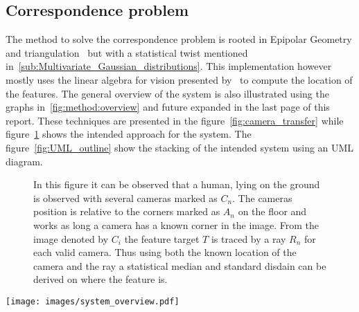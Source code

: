\subsection{Correspondence problem}
The method to solve the correspondence problem is rooted in  Epipolar Geometry and triangulation~\cite{siciliano2010robotics} but with a statistical twist mentioned in~\ref{sub:Multivariate_Gaussian_distributions}.
This implementation however mostly uses the linear algebra for vision presented by~\cite{corke2017robotics} to compute the location of the features.
The general overview of the system is also illustrated using the graphs in~\ref{fig:method:overview} and future expanded in the last page of this report.
These techniques are presented in the figure~\ref{fig:camera_transfer} while figure~\ref{fig:3Dhuman} shows the intended approach for the system.
The figure~\ref{fig:UML_outline} show the stacking of the intended system using an UML diagram.
\def\svgwidth{\columnwidth}
\begin{figure}[ht]
    \centering
           
           \caption{
               In this figure it can be observed that a human, lying on the ground is observed with several cameras marked as $C_n$.
               The cameras position is relative to the \aruco corners marked as $A_n$ on the floor and works as long a camera has a known \aruco corner in the image.
               From the image denoted by
               $C_i$
               the feature target $T$ is traced by a ray $R_n$ for each valid camera.
               Thus using both the known location of the camera and the ray a statistical median and standard disdain can be derived on where the feature is.
           }
    \label{fig:3Dhuman}
\end{figure}


\begin{figure*}[b]
    \begin{center}
        \texttt{[image: images/system\_overview.pdf]}
    \end{center}
    \caption{
        This figure describes an overview of the project. 1.0 is how to capture the data while 2.0 and so forth describes how the data is transmuted.
        5.0 is at this stage only partially planed while the last two are not planed at all right now, and the final page in this report contains all the planed sub-nodes of those.
    }
    \label{fig:method:overview}
\end{figure*}




